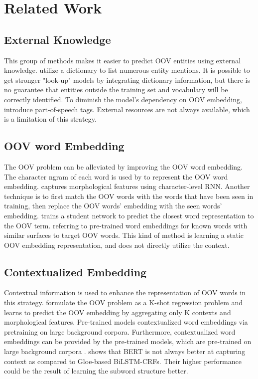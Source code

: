 \documentclass[11pt]{article}
\begin{document}
\section{Related Work}
\subsection{External Knowledge}
This group of methods makes it easier to predict OOV entities using external knowledge. \citet{zhang-yang-2018-chinese} utilize a dictionary to list numerous entity mentions. It is possible to get stronger "look-up" models by integrating dictionary information, but there is no guarantee that entities outside the training set and vocabulary will be correctly identified. To diminish the model's dependency on OOV embedding, \citet{li-etal-2018-self} introduce part-of-speech tags. External resources are not always available, which is a limitation of this strategy.


\subsection{OOV word Embedding}
The OOV problem can be alleviated by improving the OOV word embedding. The character ngram of each word is used by \citet{bojanowski-etal-2017-enriching} to represent the OOV word embedding. \citet{pinter-etal-2017-mimicking} captures morphological features using character-level RNN. Another technique is to first match the OOV words with the words that have been seen in training, then replace the OOV words' embedding with the seen words' embedding. \citet{peng2019learning} trains a student network to predict the closest word representation to the OOV term. \citet{fukuda-etal-2020-robust} referring to pre-trained word embeddings for known words with similar surfaces to target OOV words. This kind of method is learning a static OOV embedding representation, and does not directly utilize the context.

\subsection{Contextualized Embedding}
Contextual information is used to enhance the representation of OOV words in this strategy. \cite{hu-etal-2019-shot} formulate the OOV problem as a K-shot regression problem and learns to predict the OOV embedding by aggregating only K contexts and morphological features. Pre-trained models contextualized word embeddings via pretraining on large background corpora.
Furthermore, contextualized word embeddings can be provided by the pre-trained models, which are pre-trained on large background corpora \cite{peters-etal-2018-deep,devlin2018bert,liu2019roberta}. \citet{yan-etal-2021-unified-generative} shows that BERT is not always better at capturing context as compared to Gloe-based BiLSTM-CRFs. Their higher performance could be the result of learning the subword structure better.
\end{document}
